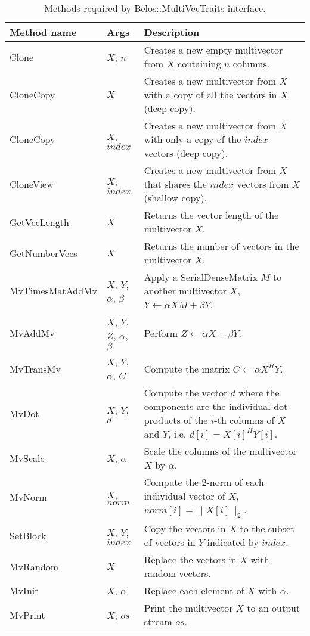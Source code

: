 \begin{table}
\begin{center}
\begin{tabular}{| p{3.5cm} |  p{2.2cm} || p{8cm} |}
\hline
Method name & Args & Description \\
\hline\hline
Clone           & $X$, $n$    
                & Creates a new empty multivector from $X$ containing $n$ columns.  \\\hline
CloneCopy       & $X$   
                & Creates a new multivector from $X$ with a copy of all the vectors in $X$ (deep copy). \\\hline
CloneCopy       & $X$, $index$   
                & Creates a new multivector from $X$ with only a copy of the $index$ vectors (deep copy). \\\hline
CloneView       & $X$, $index$ 
                & Creates a new multivector from $X$ that shares the $index$ vectors from $X$ (shallow copy).  \\\hline
GetVecLength    & $X$ 
                & Returns the vector length of the multivector $X$.  \\\hline
GetNumberVecs   & $X$
                & Returns the number of vectors in the multivector $X$.  \\\hline
MvTimesMatAddMv & $X$, $Y$, $\alpha$, $\beta$
                & Apply a SerialDenseMatrix $M$ to another multivector $X$, $Y \leftarrow \alpha X M + \beta Y$.  \\\hline
MvAddMv         & $X$, $Y$, $Z$, $\alpha$, $\beta$
                & Perform $Z \leftarrow \alpha X + \beta Y$.  \\\hline
MvTransMv       & $X$, $Y$, $\alpha$, $C$
                & Compute the matrix $C \leftarrow \alpha X^H Y$.  \\\hline
MvDot           & $X$, $Y$, $d$
                & Compute the vector $d$ where the components are the individual dot-products of the $i$-th columns of $X$ and $Y$, i.e. $d[i] = X[i]^H Y[i]$.  \\\hline
MvScale         & $X$, $\alpha$
                & Scale the columns of the multivector $X$ by $\alpha$. \\\hline
MvNorm          & $X$, $norm$
                & Compute the 2-norm of each individual vector of $X$, $norm[i]=\|X[i]\|_2$. \\\hline
SetBlock        & $X$, $Y$, $index$
                & Copy the vectors in $X$ to the subset of vectors in $Y$ indicated by $index$. \\\hline
MvRandom        & $X$
                & Replace the vectors in $X$ with random vectors.  \\\hline
MvInit          & $X$, $\alpha$
                & Replace each element of $X$ with $\alpha$.  \\\hline
MvPrint         & $X$, $os$
                & Print the multivector $X$ to an output stream $os$.  \\\hline
\hline
\end{tabular}
\caption{Methods required by Belos::MultiVecTraits interface.}
\label{tab:belos:mvt}
\end{center}
\end{table}


